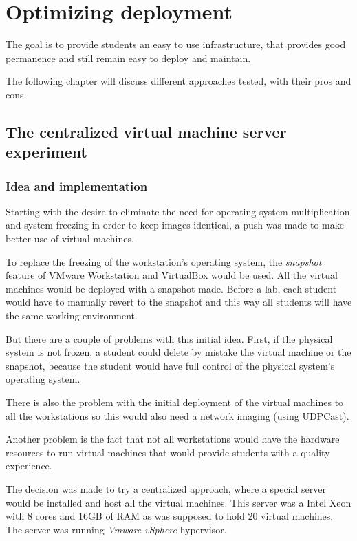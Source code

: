 
\chapter{Optimizing deployment}\label{ch:optimizations}
\bigskip

The goal is to provide students an easy to use infrastructure, that
provides good permanence and still remain easy to deploy and maintain.

The following chapter will discuss different approaches tested, with
their pros and cons.

\section{The centralized virtual machine server experiment}

\subsection{Idea and implementation}
Starting with the desire to eliminate the need for operating system
multiplication and system freezing in order to keep images identical, a
push was made to make better use of virtual machines.

To replace the freezing of the workstation's operating system, the
\emph{snapshot} feature of VMware Workstation and VirtualBox would be
used. All the virtual machines would be deployed with a snapshot made.
Before a lab, each student would have to manually revert to the
snapshot and this way all students will have the same working
environment.

But there are a couple of problems with this initial idea. First, if the
physical system is not frozen, a student could delete by mistake the
virtual machine or the snapshot, because the student would have full
control of the physical system's operating system.

There is also the problem with the initial deployment of the virtual
machines to all the workstations so this would also need a network
imaging (using UDPCast).

Another problem is the fact that not all workstations would have the
hardware resources to run virtual machines that would provide students
with a quality experience.

The decision was made to try a centralized approach, where a special
server would be installed and host all the virtual machines. This server
was a Intel Xeon with 8 cores and 16GB of RAM as was supposed to hold 20
virtual machines. The server was running \emph{Vmware vSphere}
hypervisor.

